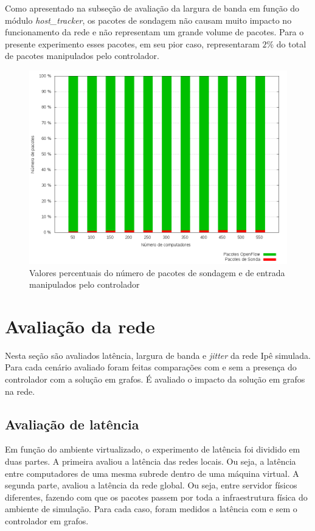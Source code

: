 Como apresentado na subseção de avaliação da largura de banda em função do 
módulo \emph{host\_tracker}, os pacotes de sondagem não causam muito impacto 
no funcionamento da rede e não representam um grande volume de pacotes.
Para o presente experimento esses pacotes, em seu pior caso, representaram
$2\%$ do total de pacotes manipulados pelo controlador.

\begin{figure}[!htb]
    \centering
    \label{fig:npings-x-packets-in-stacked}
    \includegraphics[width=\linewidth]{img/npings-x-packets-in-stacked}
    \caption{Valores percentuais do número de pacotes de sondagem e de 
        entrada manipulados pelo controlador}
\end{figure}

\section{Avaliação da rede}

Nesta seção são avaliados latência, largura de banda e \emph{jitter} da 
rede Ipê simulada.
Para cada cenário avaliado foram feitas comparações com e sem a presença 
do controlador com a solução em grafos. 
É avaliado o impacto da solução em grafos na rede.

\subsection{Avaliação de latência}

Em função do ambiente virtualizado, o experimento de latência foi dividido em 
duas partes.
A primeira avaliou a latência das redes locais.
Ou seja, a latência entre computadores de uma mesma subrede dentro de uma 
máquina virtual.
A segunda parte, avaliou a latência da rede global.
Ou seja, entre servidor físicos diferentes, fazendo com que os pacotes 
passem por toda a infraestrutura física do ambiente de simulação.
Para cada caso, foram medidos a latência com e sem o controlador em grafos.

